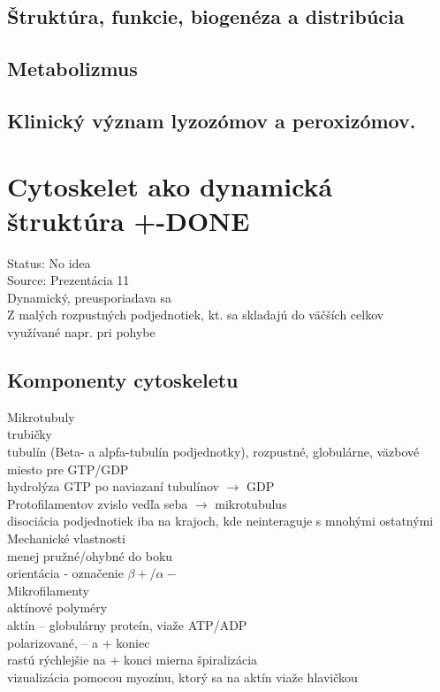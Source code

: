 \subsection{Štruktúra, funkcie, biogenéza a distribúcia}

\subsection{Metabolizmus}

\subsection{Klinický význam lyzozómov a peroxizómov. }

\section{Cytoskelet ako dynamická štruktúra +-DONE}

Status: No idea\\
Source: Prezentácia 11\\

Dynamický, preusporiadava sa\\
Z malých rozpustných podjednotiek, kt. sa skladajú do väčších celkov\\
\tab využívané napr. pri pohybe\\
\subsection{Komponenty cytoskeletu}
Mikrotubuly\\
\tab trubičky\\
\tab tubulín (Beta- a alpfa-tubulín podjednotky), rozpustné, globulárne, väzbové miesto pre GTP/GDP\\
\tab hydrolýza GTP po naviazaní tubulínov $\rightarrow$ GDP\\
 Protofilamentov zvislo vedľa seba $\rightarrow$ mikrotubulus\\
\tab disociácia podjednotiek iba na krajoch, kde neinteraguje s mnohými ostatnými\\

Mechanické vlastnosti\\
\tab menej pružné/ohybné do boku\\
\tab orientácia - označenie $\beta+$/$\alpha-$\\

Mikrofilamenty\\
\tab aktínové polyméry\\
\tab aktín -- globulárny proteín, viaže ATP/ADP\\
\tab polarizované, -- a + koniec\\
\tab rastú rýchlejšie na + konci
\tab mierna špiralizácia\\
\tab vizualizácia pomocou myozínu, ktorý sa na aktín viaže hlavičkou\\

